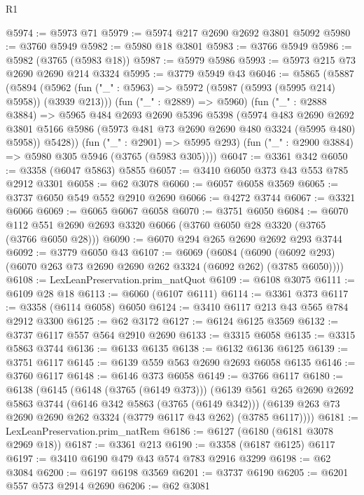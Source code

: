 \begin{lexlean}{R1}
\begin{coremodule}
@5974 := @5973 @71
@5979 := @5974 @217 @2690 @2692 @3801 @5092
@5980 := @3760 @5949
@5982 := @5980 @18 @3801
@5983 := @3766 @5949
@5986 := @5982 (@3765 (@5983 @18))
@5987 := @5979 @5986
@5993 := @5973 @215 @73 @2690 @2690 @214 @3324
@5995 := @3779 @5949 @43
@6046 := @5865
    (@5887
      (@5894
        (@5962 (fun ("_" : @5963) => @5972 (@5987 (@5993 (@5995 @214) @5958)) (@3939 @213)))
        (fun ("_" : @2889) => @5960)
        (fun ("_" : @2888 @3884) =>
        @5965
          @484
          @2693
          @2690
          @5396
          @5398
          (@5974
            @483
            @2690
            @2692
            @3801
            @5166
            @5986
            (@5973 @481 @73 @2690 @2690 @480 @3324 (@5995 @480) @5958))
          @5428))
      (fun ("_" : @2901) => @5995 @293)
      (fun ("_" : @2900 @3884) => @5980 @305 @5946 (@3765 (@5983 @305))))
@6047 := @3361 @342
@6050 := @3358 (@6047 @5863) @5855
@6057 := @3410 @6050 @373 @43 @553 @785 @2912 @3301
@6058 := @62 @3078
@6060 := @6057 @6058 @3569
@6065 := @3737 @6050 @549 @552 @2910 @2690
@6066 := @4272 @3744
@6067 := @3321 @6066
@6069 := @6065 @6067 @6058
@6070 := @3751 @6050
@6084 := @6070 @112 @551 @2690 @2693 @3320 @6066 (@3760 @6050 @28 @3320 (@3765 (@3766 @6050 @28)))
@6090 := @6070 @294 @265 @2690 @2692 @293 @3744
@6092 := @3779 @6050 @43
@6107 := @6069
    (@6084 (@6090 (@6092 @293) (@6070 @263 @73 @2690 @2690 @262 @3324 (@6092 @262) (@3785 @6050))))
@6108 := LexLeanPreservation.prim_natQuot
@6109 := @6108 @3075
@6111 := @6109 @28 @18
@6113 := @6060 (@6107 @6111)
@6114 := @3361 @373
@6117 := @3358 (@6114 @6058) @6050
@6124 := @3410 @6117 @213 @43 @565 @784 @2912 @3300
@6125 := @62 @3172
@6127 := @6124 @6125 @3569
@6132 := @3737 @6117 @557 @564 @2910 @2690
@6133 := @3315 @6058
@6135 := @3315 @5863 @3744
@6136 := @6133 @6135
@6138 := @6132 @6136 @6125
@6139 := @3751 @6117
@6145 := @6139 @559 @563 @2690 @2693 @6058 @6135
@6146 := @3760 @6117
@6148 := @6146 @373 @6058
@6149 := @3766 @6117
@6180 := @6138
    (@6145
      (@6148 (@3765 (@6149 @373)))
      (@6139
        @561
        @265
        @2690
        @2692
        @5863
        @3744
        (@6146 @342 @5863 (@3765 (@6149 @342)))
        (@6139 @263 @73 @2690 @2690 @262 @3324 (@3779 @6117 @43 @262) (@3785 @6117))))
@6181 := LexLeanPreservation.prim_natRem
@6186 := @6127 (@6180 (@6181 @3078 @2969 @18))
@6187 := @3361 @213
@6190 := @3358 (@6187 @6125) @6117
@6197 := @3410 @6190 @479 @43 @574 @783 @2916 @3299
@6198 := @62 @3084
@6200 := @6197 @6198 @3569
@6201 := @3737 @6190
@6205 := @6201 @557 @573 @2914 @2690
@6206 := @62 @3081

\end{coremodule}
\end{lexlean}
